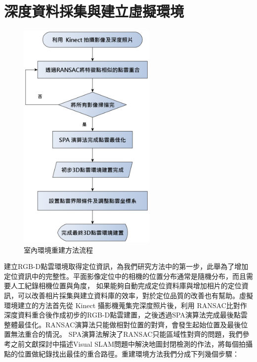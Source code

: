 \section{深度資料採集與建立虛擬環境}

\begin{figure}
\begin{center}
  \includegraphics[width=0.6\textwidth]{figures/Environment_Building.eps}
  \caption{室內環境重建方法流程}
  \label{fig:Environment Building Process}
\end{center}
\end{figure}

   建立RGB-D點雲環境取得定位資訊，為我們研究方法中的第一步，此舉為了增加定位資訊中的完整性。平面影像定位中的相機的位置分布通常是隨機分布，而且需要人工紀錄相機位置與角度，
如果能夠自動完成定位資料庫與增加相片的定位資訊，可以改善相片採集與建立資料庫的效率，對於定位品質的改善也有幫助。虛擬環境建立的方法首先從 Kinect 攝影機蒐集完深度照片後，利用
RANSAC比對作深度資料重合後作成初步的RGB-D點雲建置，之後透過SPA演算法完成最後點雲整體最佳化。RANSAC演算法只能做相對位置的對齊，會發生起始位置及最後位置無法重合的情況。
SPA演算法解決了RANSAC只能區域性對齊的問題，我們參考之前文獻探討中描述Visual SLAM問題中解決地圖封閉檢測的作法，將每個拍攝點的位置做紀錄找出最佳的重合路徑。重建環境方法我們分成下列幾個步驟：
   
